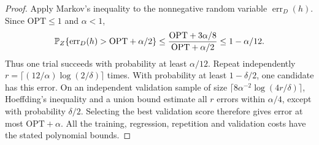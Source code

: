 \begin{proof}
Apply Markov's inequality to the nonnegative random variable
$\operatorname{err}_D(h)$. Since $\mathrm{OPT}\le1$ and $\alpha<1$,
\[
 \mathbb P_Z\{\operatorname{err}_D(h)>\mathrm{OPT}+\alpha/2\}
 \le\frac{\mathrm{OPT}+3\alpha/8}{\mathrm{OPT}+\alpha/2}
 \le1-\alpha/12.
\]
Thus one trial succeeds with probability at least $\alpha/12$.
Repeat independently
$r=\lceil(12/\alpha)\log(2/\delta)\rceil$ times.
With probability at least $1-\delta/2$, one candidate has this error.
On an independent validation sample of size
$\lceil8\alpha^{-2}\log(4r/\delta)\rceil$, Hoeffding's inequality and a
union bound estimate all $r$ errors within $\alpha/4$, except with
probability $\delta/2$. Selecting the best validation score therefore
gives error at most $\mathrm{OPT}+\alpha$. All the training,
regression, repetition and validation costs have the stated polynomial
bounds.
\end{proof}
